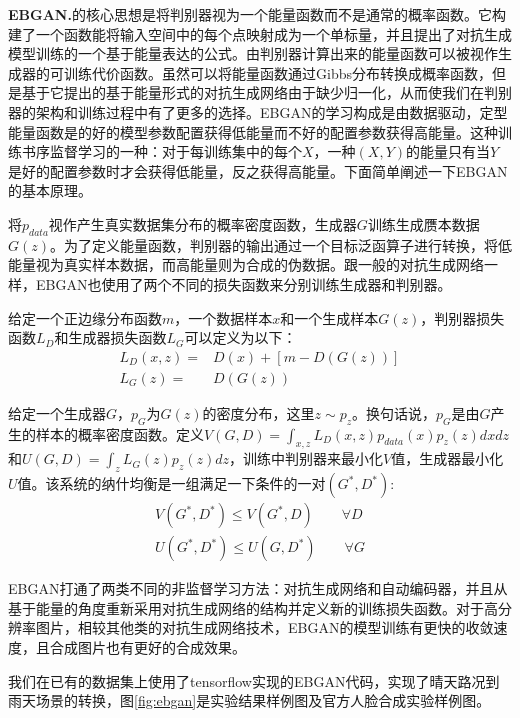 \textbf{EBGAN.}\cite{ebgan}\quad 的核心思想是将判别器视为一个能量函数而不是通常的概率函数。它构建了一个函数能将输入空间中的每个点映射成为一个单标量，并且提出了对抗生成模型训练的一个基于能量表达的公式。由判别器计算出来的能量函数可以被视作生成器的可训练代价函数。虽然可以将能量函数通过Gibbs分布转换成概率函数，但是基于它提出的基于能量形式的对抗生成网络由于缺少归一化，从而使我们在判别器的架构和训练过程中有了更多的选择。EBGAN的学习构成是由数据驱动，定型能量函数是的好的模型参数配置获得低能量而不好的配置参数获得高能量。这种训练书序监督学习的一种：对于每训练集中的每个$X$，一种$(X,Y)$的能量只有当$Y$是好的配置参数时才会获得低能量，反之获得高能量。下面简单阐述一下EBGAN的基本原理。

将$p_{data}$视作产生真实数据集分布的概率密度函数，生成器$G$训练生成赝本数据$G(z)$。为了定义能量函数，判别器的输出通过一个目标泛函算子进行转换，将低能量视为真实样本数据，而高能量则为合成的伪数据。跟一般的对抗生成网络一样，EBGAN也使用了两个不同的损失函数来分别训练生成器和判别器。

给定一个正边缘分布函数$m$，一个数据样本$x$和一个生成样本$G(z)$，判别器损失函数$L_D$和生成器损失函数$L_G$可以定义为以下：
\begin{equation}
    \begin{align*}
    L_D(x, z) = & D(x) + [m - D(G(z))] \\
    L_G(z) = & D(G(z))
    \end{align*}
\end{equation}

给定一个生成器$G$，$p_G$为$G(z)$的密度分布，这里$z\sim p_z$。换句话说，$p_G$是由$G$产生的样本的概率密度函数。定义$V(G,D)=\int_{x,z}L_D(x,z)p_{data}(x)p_z(z)dxdz$和$U(G,D)=\int_zL_G(z)p_z(z)dz$，训练中判别器来最小化$V$值，生成器最小化$U$值。该系统的纳什均衡是一组满足一下条件的一对$(G^*,D^*)$:
\begin{equation}
    \begin{aligned}
        V(G^*,D^*) \leq V(G^*,D) \quad\quad \forall D \\
        U(G^*,D^*) \leq U(G,D^*) \quad\quad \forall G 
    \end{aligned}
\end{equation}

EBGAN打通了两类不同的非监督学习方法：对抗生成网络和自动编码器，并且从基于能量的角度重新采用对抗生成网络的结构并定义新的训练损失函数。对于高分辨率图片，相较其他类的对抗生成网络技术，EBGAN的模型训练有更快的收敛速度，且合成图片也有更好的合成效果。

我们在已有的数据集上使用了tensorflow实现的EBGAN代码\cite{ebgan-github}，实现了晴天路况到雨天场景的转换，图\ref{fig:ebgan}是实验结果样例图及官方人脸合成实验样例图。

